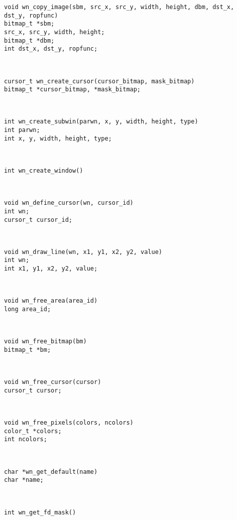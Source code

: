 \parbox[t]{5in}{\tt void wn\_copy\_image(sbm, src\_x, src\_y, width, height, dbm, dst\_x, dst\_y, ropfunc)\\bitmap\_t *sbm;\\src\_x, src\_y, width, height;\\bitmap\_t *dbm;\\int dst\_x, dst\_y, ropfunc;}\> \pageref{wn_copy_image}\\[0.1in]
\parbox[t]{5in}{\tt cursor\_t wn\_create\_cursor(cursor\_bitmap, mask\_bitmap)\\bitmap\_t *cursor\_bitmap, *mask\_bitmap;}\> \pageref{wn_create_cursor}\\[0.1in]
\parbox[t]{5in}{\tt int wn\_create\_subwin(parwn, x, y, width, height, type)\\int parwn;\\int x, y, width, height, type;}\> \pageref{wn_create_subwin}\\[0.1in]
\parbox[t]{5in}{\tt int wn\_create\_window()}\> \pageref{wn_create_window}\\[0.1in]
\parbox[t]{5in}{\tt void wn\_define\_cursor(wn, cursor\_id)\\int wn;\\cursor\_t cursor\_id;}\> \pageref{wn_define_cursor}\\[0.1in]
\parbox[t]{5in}{\tt void wn\_draw\_line(wn, x1, y1, x2, y2, value)\\int wn;\\int x1, y1, x2, y2, value;}\> \pageref{wn_draw_line}\\[0.1in]
\parbox[t]{5in}{\tt void wn\_free\_area(area\_id)\\long area\_id;}\> \pageref{wn_free_area}\\[0.1in]
\parbox[t]{5in}{\tt void wn\_free\_bitmap(bm)\\bitmap\_t *bm;}\> \pageref{wn_free_bitmap}\\[0.1in]
\parbox[t]{5in}{\tt void wn\_free\_cursor(cursor)\\cursor\_t cursor;}\> \pageref{wn_free_cursor}\\[0.1in]
\parbox[t]{5in}{\tt void wn\_free\_pixels(colors, ncolors)\\color\_t *colors;\\int ncolors;}\> \pageref{wn_free_pixels}\\[0.1in]
\parbox[t]{5in}{\tt char *wn\_get\_default(name)\\char *name;}\> \pageref{wn_get_default}\\[0.1in]
\parbox[t]{5in}{\tt int wn\_get\_fd\_mask()}\> \pageref{wn_get_fd_mask}\\[0.1in]
